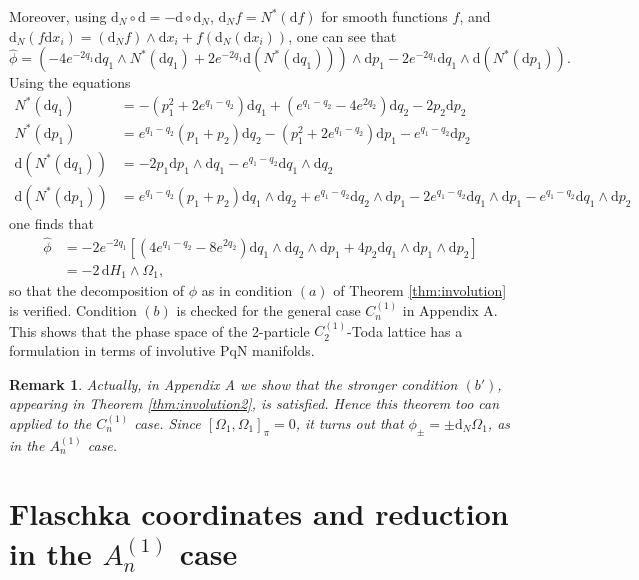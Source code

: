 \documentclass[12pt]{article}
\newtheorem{remark}[theorem]{Remark}
\newenvironment{rem}{\begin{remark} \rm}{\end{remark}}
\def\d{{\mathrm d}}
\begin{document}
Moreover,  using $\d_{N}\circ \d=-\d\circ \d_{N}$, $\d_{N}f=N^*(\d f)$ for smooth functions $f$, 
and $\d_{N}(f \d x_i)=(\d_{N}f)\wedge \d x_i+f(\d_{N}(\d x_i))$, one can see that
\begin{equation}
\widehat{\phi}=\left(-4e^{-2q_1}\d q_1\wedge N^*(\d q_1)+2e^{-2q_1}\d(N^*(\d q_1))\right)\wedge \d p_1-2e^{-2q_1}\d q_1\wedge \d(N^*(\d p_1)).\label{eq: phi_expression}
\end{equation}
Using the equations
\begin{equation}\label{eq: differentials}
\begin{aligned}
N^{*}(\d q_1)&=-(p_1^2+2e^{q_1-q_2})\d q_1+(e^{q_1-q_2}-4e^{2q_2})\d q_2-2p_2\d p_2\\
N^*(\d p_1)&=e^{q_1-q_2}(p_1+p_2)\d q_2-(p_1^2+2e^{q_1-q_2})\d p_1-e^{q_1-q_2}\d p_2\\
\d(N^{*}(\d q_1))&=-2p_1\d p_1\wedge \d q_1-e^{q_1-q_2}\d q_1\wedge \d q_2\\
\d(N^*(\d p_1))&=e^{q_1-q_2}(p_1+p_2)\d q_1\wedge \d q_2+e^{q_1-q_2}\d q_2\wedge \d p_1-2e^{q_1-q_2}\d q_1\wedge \d p_1-e^{q_1-q_2}\d q_1\wedge \d p_2
\end{aligned}
\end{equation}
one finds that %
\begin{align*}
\widehat{\phi}&=-2e^{-2q_1}\left[\left(4e^{q_1-q_2}-8e^{2q_2}\right)\d q_1\wedge \d q_2\wedge \d p_1+4p_2\d q_1\wedge \d p_1\wedge \d p_2\right]\\
&=-2\,\d H_1\wedge\Omega_1,
\end{align*}
so that the decomposition of $\widehat{\phi}$ as in condition $(a)$ of Theorem \ref{thm:involution} is verified. 
Condition $(b)$ %
is checked for the general case $C_n^{(1)}$ in Appendix A. This shows that 
the phase space of the 2-particle $C_2^{(1)}$-Toda lattice has a formulation in terms of involutive PqN manifolds.
\begin{rem} Actually, in Appendix A we show that the stronger condition $(b')$, appearing in Theorem \ref{thm:involution2}, is satisfied. Hence this theorem too can applied to the $C_n^{(1)}$ case. 
Since $\left[\Omega_1,\Omega_1\right]_\pi=0$, it turns out that 
$\phi_\pm=\pm \d_N\Omega_1$, as in the $A_n^{(1)}$ case.
\end{rem}

\section{Flaschka coordinates and reduction in the $A_n^{(1)}$ case}
\label{sec:Flaschka}
\end{document}
